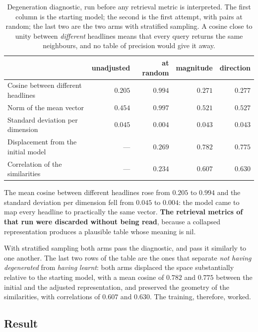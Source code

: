 \begin{table}[htbp]
\centering
\small
\caption[Degeneration diagnostic of the adjusted encoders]{Degeneration diagnostic, run before
any retrieval metric is interpreted. The first column is the starting model; the second is the
first attempt, with pairs at random; the last two are the two arms with stratified sampling. A
cosine close to unity between \emph{different} headlines means that every query returns the same
neighbours, and no table of precision would give it away.}
\label{tab:av_qi4_colapso}
\begin{tabular}{lrrrr}
\toprule
 & unadjusted & at random & magnitude & direction \\
\midrule
Cosine between different headlines & $0.205$ & $\mathbf{0.994}$ & $0.271$ & $0.277$ \\
Norm of the mean vector            & $0.454$ & $\mathbf{0.997}$ & $0.521$ & $0.527$ \\
Standard deviation per dimension   & $0.045$ & $\mathbf{0.004}$ & $0.043$ & $0.043$ \\
Displacement from the initial model & ---    & $0.269$          & $0.782$ & $0.775$ \\
Correlation of the similarities    & ---     & $0.234$          & $0.607$ & $0.630$ \\
\bottomrule
\end{tabular}
\end{table}

The mean cosine between different headlines rose from $0.205$ to $0.994$ and the standard
deviation per dimension fell from $0.045$ to $0.004$: the model came to map every headline to
practically the same vector. \textbf{The retrieval metrics of that run were discarded without
being read}, because a collapsed representation produces a plausible table whose meaning is nil.

With stratified sampling both arms pass the diagnostic, and pass it similarly to one another. The
last two rows of the table are the ones that separate \emph{not having degenerated} from
\emph{having learnt}: both arms displaced the space substantially relative to the starting model,
with a mean cosine of $0.782$ and $0.775$ between the initial and the adjusted representation,
and preserved the geometry of the similarities, with correlations of $0.607$ and $0.630$. The
training, therefore, worked.

\subsection{Result}

